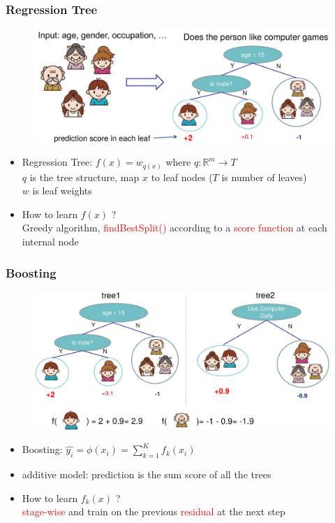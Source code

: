 \documentclass{beamer}
\begin{document}
\begin{frame}
	\frametitle{Regression Tree}
		\begin{figure}
			\includegraphics[width=1\linewidth]{figs/regressiontree}
		\end{figure}
		
		\begin{itemize}
			\item Regression Tree: $f(x)=w_{q(x)}$ where $q: \mathbb{R}^m \rightarrow T$\\ 
			$q$ is the tree structure, map $x$ to leaf nodes ($T$ is number of leaves) \\
			$w$ is leaf weights		
			\item How to learn $f(x)$ ? \\ 
			Greedy algorithm, \textcolor{red}{findBestSplit()} according to a \textcolor{red}{score function} at each internal node
			
		\end{itemize}
	
\end{frame}

\begin{frame}
	\frametitle{Boosting}
	\begin{figure}
		\includegraphics[width=1\linewidth]{figs/boostingtree}
	\end{figure}
	
	\begin{itemize}
		\item Boosting: $\widehat{y_i}=\phi(x_i)=\sum_{k=1}^{K}f_k(x_i)$  
		\item additive model: prediction is the sum score of all the trees
		\item How to learn $f_k(x)$ ? \\ 
		\textcolor{red}{stage-wise} and train on the previous \textcolor{red}{residual} at the next step
	\end{itemize}
	
\end{frame}
\end{document}
